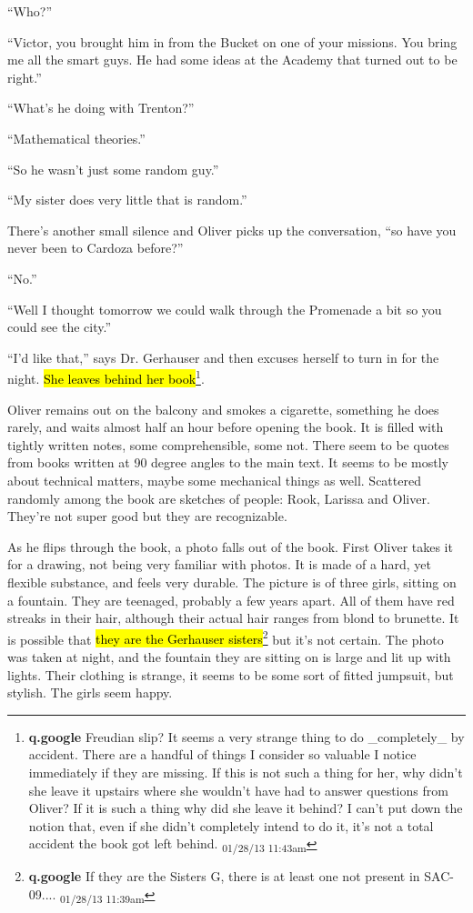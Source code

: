 ``Who?''

``Victor, you brought him in from the Bucket on one of your missions.  You bring me all the smart guys.  He had some ideas at the Academy that turned out to be right.''

``What's he doing with Trenton?''

``Mathematical theories.''

``So he wasn't just some random guy.''

``My sister does very little that is random.''

There's another small silence and Oliver picks up the conversation, ``so have you never been to Cardoza before?''

``No.''

``Well I thought tomorrow we could walk through the Promenade a bit so you could see the city.''

``I'd like that,'' says Dr. Gerhauser and then excuses herself to turn in for the night.  \hl{She leaves behind her book}\footnote{\textbf{q.google }Freudian slip?  It seems a very strange thing to do \_completely\_ by accident.  There are a handful of things I consider so valuable I notice immediately if they are missing.  If this is not such a thing for her, why didn't she leave it upstairs where she wouldn't have had to answer questions from Oliver?  If it is such a thing why did she leave it behind?  I can't put down the notion that, even if she didn't completely intend to do it, it's not a total accident the book got left behind. \textsubscript{01/28/13 11:43am}}.



Oliver remains out on the balcony and smokes a cigarette, something he does rarely, and waits almost half an hour before opening the book.  It is filled with tightly written notes, some comprehensible, some not.  There seem to be quotes from books written at 90 degree angles to the main text.  It seems to be mostly about technical matters, maybe some mechanical things as well.  Scattered randomly among the book are sketches of people: Rook, Larissa and Oliver.  They're not super good but they are recognizable.



As he flips through the book, a photo falls out of the book.  First Oliver takes it for a drawing, not being very familiar with photos.  It is made of a hard, yet flexible substance, and feels very durable.  The picture is of three girls, sitting on a fountain.  They are teenaged, probably a few years apart.  All of them have red streaks in their hair, although their actual hair ranges from blond to brunette.  It is possible that \hl{they are the Gerhauser sisters}\footnote{\textbf{q.google }If they are the Sisters G, there is at least one not present in SAC-09.... \textsubscript{01/28/13 11:39am}} but it's not certain.  The photo was taken at night, and the fountain they are sitting on is large and lit up with lights.  Their clothing is strange, it seems to be some sort of fitted jumpsuit, but stylish.  The girls seem happy.



